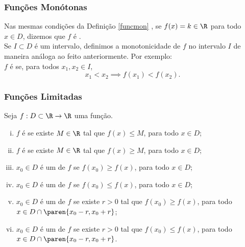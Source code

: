 \documentclass[brazil, notheorems, 10pt]{beamer}
\begin{document}
\begin{frame}
\frametitle{Funções Monótonas} %



Nas mesmas condições da Definição \ref{funcmon} , se $f(x) = k \in
\R$ para todo $x \in D$, dizemos que $f$ é .\\ \pause
Se $I \subset D$ é um intervalo, definimos a monotonicidade de $f$
no intervalo $I$ de maneira análoga ao feito anteriormente. Por
exemplo: \\
$f$ é  se, para todos
$x_1, x_2 \in I$,
	$$x_1 < x_2 \implies f(x_1) < f(x_2).$$


\end{frame}




\begin{frame}
\frametitle{Funções Limitadas} %

\begin{Def}
Seja $f: D \subset \R \to \R$ uma função.
\begin{enumerate}[(i)]
	\item $f$ é  se existe $M \in \R$ tal
	que $f(x) \leq M$, para todo $x \in D$;
	\item $f$ é  se existe $M \in \R$ tal
	que $f(x) \geq M$, para todo $x \in D$;
	\item $x_0 \in D$ é um  de $f$ se
	$f(x_0) \geq f(x)$, para todo $x \in D$;
	\item $x_0 \in D$ é um  de $f$ se
	$f(x_0) \leq f(x)$, para todo $x \in D$;
	\item $x_0 \in D$ é um  de $f$ se
	existe $r>0$ tal que $f(x_0) \geq f(x)$, para todo $x \in D \cap \paren{x_0 - r , x_0+r}$;
	\item $x_0 \in D$ é um  de $f$ se
	existe $r>0$ tal que $f(x_0) \leq f(x)$, para todo $x \in D \cap \paren{x_0 - r ,
	x_0+r}$.
\end{enumerate}
\end{Def}

\end{frame}
\end{document}
